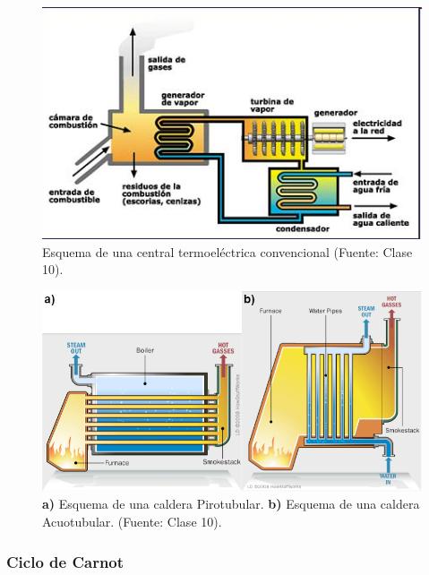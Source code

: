             \begin{figure}[H]
                \includegraphics[width=\textwidth]{img/clases/centrales_termoelectricas_convencionales.png}
                \caption{Esquema de una central termoeléctrica convencional (Fuente: Clase 10).}
                \label{fig:central_convencional}
            \end{figure}
            
            \begin{figure}[H]
                \includegraphics[width=\textwidth]{img/clases/caldera.png}
                \caption[Esquema de calderas (Fuente: Clase 10)]{\textbf{a)} Esquema de una caldera {\color[HTML]{FE0000}Piro}tubular. \textbf{b)} Esquema de una caldera {\color[HTML]{0000FE}Acuo}tubular. (Fuente: Clase 10).}
                \label{fig:central_convencional_2}
            \end{figure}
        
        \subsubsection{Ciclo de Carnot}
        
